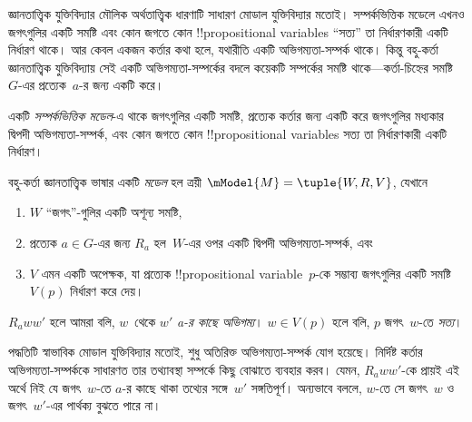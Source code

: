 \documentclass[../../../include/open-logic-section]{subfiles}
\begin{document}


জ্ঞানতাত্ত্বিক যুক্তিবিদ্যার মৌলিক অর্থতাত্ত্বিক ধারণাটি সাধারণ মোডাল যুক্তিবিদ্যার মতোই। সম্পর্কভিত্তিক মডেলে এখনও জগৎগুলির একটি সমষ্টি এবং কোন জগতে কোন !!{propositional
variable}s ``সত্য'' তা নির্ধারণকারী একটি নির্ধারণ থাকে। আর কেবল একজন কর্তার কথা হলে, যথারীতি একটি অভিগম্যতা-সম্পর্ক থাকে। কিন্তু বহু-কর্তা জ্ঞানতাত্ত্বিক যুক্তিবিদ্যায় সেই একটি অভিগম্যতা-সম্পর্কের বদলে কয়েকটি সম্পর্কের সমষ্টি থাকে—কর্তা-চিহ্নের সমষ্টি~$G$-এর প্রত্যেক~$a$-র জন্য একটি করে।

একটি \emph{সম্পর্কভিত্তিক মডেল}-এ থাকে জগৎগুলির একটি সমষ্টি, প্রত্যেক কর্তার জন্য একটি করে জগৎগুলির মধ্যকার দ্বিপদী অভিগম্যতা-সম্পর্ক, এবং কোন জগতে কোন !!{propositional variable}s সত্য তা নির্ধারণকারী একটি নির্ধারণ।

\begin{defn}
  বহু-কর্তা জ্ঞানতাত্ত্বিক ভাষার একটি \emph{মডেল} হল ত্রয়ী
  $\mModel{M} = \tuple{W, R, V}$, যেখানে
  \begin{enumerate}
  \item $W$ ``জগৎ''-গুলির একটি অশূন্য সমষ্টি,
  \item প্রত্যেক $a \in G$-এর জন্য ${R}_a$ হল~$W$-এর ওপর একটি দ্বিপদী অভিগম্যতা-সম্পর্ক, এবং
  \item $V$ এমন একটি অপেক্ষক, যা প্রত্যেক !!{propositional
    variable}~$p$-কে সম্ভাব্য জগৎগুলির একটি সমষ্টি $V(p)$ নির্ধারণ করে দেয়।
  \end{enumerate}
  $R_a ww'$ হলে আমরা বলি, $w$~থেকে $w'$ \emph{a-র কাছে অভিগম্য}। $w \in V(p)$ হলে বলি, $p$ জগৎ~$w$-তে \emph{সত্য}।
\end{defn}

পদ্ধতিটি স্বাভাবিক মোডাল যুক্তিবিদ্যার মতোই, শুধু অতিরিক্ত অভিগম্যতা-সম্পর্ক যোগ হয়েছে। নির্দিষ্ট কর্তার অভিগম্যতা-সম্পর্ককে সাধারণত তার তথ্যাবস্থা সম্পর্কে কিছু বোঝাতে ব্যবহার করব। যেমন, $R_a ww'$-কে প্রায়ই এই অর্থে নিই যে জগৎ~$w$-তে $a$-র কাছে থাকা তথ্যের সঙ্গে~$w'$ সঙ্গতিপূর্ণ। অন্যভাবে বললে, $w$-তে সে জগৎ~$w$ ও জগৎ~$w'$-এর পার্থক্য বুঝতে পারে না।
\end{document}
